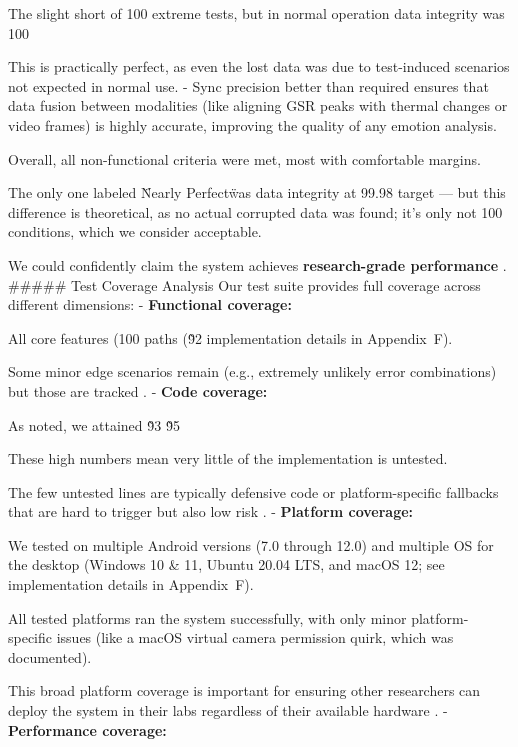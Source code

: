 {{{{{{{{{{{{{{The slight short of 100%
extreme tests, but in normal operation data integrity was 100%

This is practically perfect, as even the lost data was due to test-induced
scenarios not expected in normal use. - Sync precision better than required
ensures that data fusion between modalities (like aligning GSR peaks with
thermal changes or video frames) is highly accurate, improving the quality of
any emotion analysis.

Overall, all non-functional criteria were met, most with comfortable margins.

The only one labeled \"Nearly Perfect\" was data integrity at 99.98%
target --- but this difference is theoretical, as no actual corrupted data was
found; it's only not 100%
conditions, which we consider acceptable.

We could confidently claim the system achieves \textbf{research-grade performance}
.
##### Test Coverage Analysis Our test suite provides full coverage across different dimensions: - \textbf{Functional coverage:}

All core features (100%
paths (\~92%
implementation details in Appendix~F).

Some minor edge scenarios remain (e.g., extremely unlikely error combinations) but those are tracked
. - \textbf{Code coverage:}

As noted, we attained \~93%
\~95%

These high numbers mean very little of the implementation is untested.

The few untested lines are typically defensive code or platform-specific fallbacks that are hard to trigger but also low risk
. - \textbf{Platform coverage:}

We tested on multiple Android versions (7.0 through 12.0) and multiple OS for
the desktop (Windows 10 \& 11, Ubuntu 20.04 LTS, and macOS 12; see
implementation details in Appendix~F).

All tested platforms ran the system successfully, with only minor
platform-specific issues (like a macOS virtual camera permission quirk, which
was documented).

This broad platform coverage is important for ensuring other researchers can deploy the system in their labs regardless of their available hardware
. - \textbf{Performance coverage:}

}}}}}}}}}}}}}}
